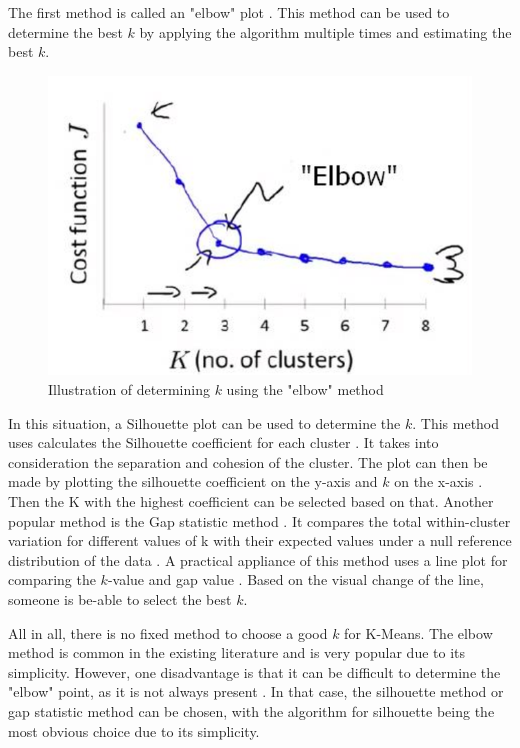 The first method is called an "elbow" plot \citep{kodinariya_review_2013}.
This method can be used to determine the best $k$ by applying the algorithm multiple times and estimating the best $k$.
\begin{figure}[H]
  \includegraphics{TheorethicalFramework/dentification-of-Elbow-point.png}
  \caption{Illustration of determining $k$ using the "elbow" method \citep{kodinariya_review_2013}}
\end{figure}
In this situation, a Silhouette plot can be used to determine the $k$.
This method uses calculates the Silhouette coefficient for each cluster \citep{saputra_effect_2020}.
It takes into consideration the separation and cohesion of the cluster.
The plot can then be made by plotting the silhouette coefficient on the y-axis and $k$ on the x-axis \citep{saputra_effect_2020}.
Then the K with the highest coefficient can be selected based on that. \newline
Another popular method is the Gap statistic method \citep{yuan_research_2019}.
It compares the total within-cluster variation for different values of k with their expected values under a null reference distribution of the data \citep{tibshirani_estimating_2001}.
A practical appliance of this method uses a line plot for comparing the $k$-value and gap value \citep{yuan_research_2019}.
Based on the visual change of the line, someone is be-able to select the best $k$.

All in all, there is no fixed method to choose a good $k$ for K-Means.
The elbow method is common in the existing literature and is very popular due to its simplicity.
However, one disadvantage is that it can be difficult to determine the "elbow" point, as it is not always present \citep{kodinariya_review_2013}.
In that case, the silhouette method or gap statistic method can be chosen, with the algorithm for silhouette being the most obvious choice due to its simplicity.
